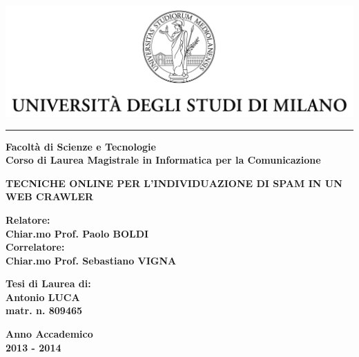 \begin{titlepage}
\begin{center}

 \includegraphics{immagini/marchio}
\rule[0.1cm]{13cm}{0.6mm}
{\bf Facoltà di Scienze e Tecnologie\\
Corso di Laurea Magistrale in Informatica per la Comunicazione}
\end{center}
\vspace{15mm}
\begin{center}
\vspace{3mm}
{\LARGE{\bf TECNICHE ONLINE PER L'INDIVIDUAZIONE DI SPAM IN UN WEB CRAWLER}}\\
\vspace{3mm}
\end{center}
  


\vspace{40mm}
\par
\noindent
\begin{minipage}[t]{0.60\textwidth}
{\large{\bf Relatore:\\
Chiar.mo Prof. Paolo BOLDI}}\\
{\large{\bf Correlatore:\\
Chiar.mo Prof. Sebastiano VIGNA}}
\end{minipage}
\hfill
\begin{minipage}[t]{0.47\textwidth}\raggedleft
{\large{\bf Tesi di Laurea di:\\
Antonio LUCA\\
matr. n. 809465}}
\end{minipage}
\vspace{20mm}
\begin{center}
{\large{\bf %
Anno Accademico\\ 2013 - 2014 }}%
\end{center}
\end{titlepage}